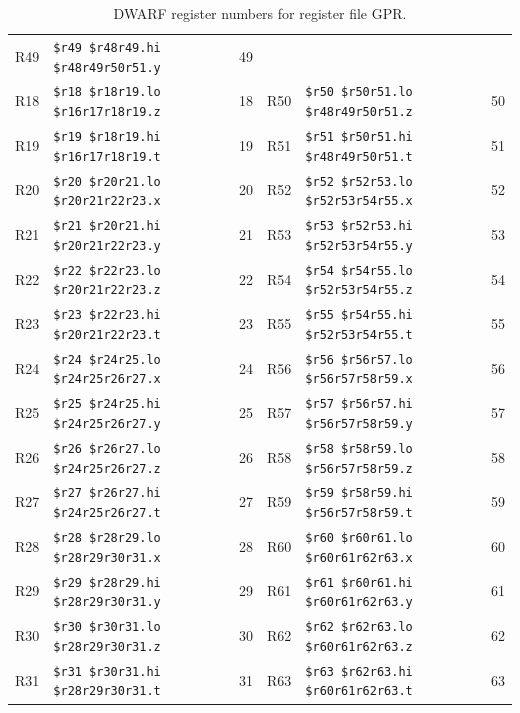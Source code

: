 \begin{table}
\begin{center}
{\begin{tabular}{|l|l|l||l|l|l|}
R49 & \verb|$r49 $r48r49.hi $r48r49r50r51.y| & 49 \\
R18 & \verb|$r18 $r18r19.lo $r16r17r18r19.z| & 18 &
R50 & \verb|$r50 $r50r51.lo $r48r49r50r51.z| & 50 \\
R19 & \verb|$r19 $r18r19.hi $r16r17r18r19.t| & 19 &
R51 & \verb|$r51 $r50r51.hi $r48r49r50r51.t| & 51 \\
R20 & \verb|$r20 $r20r21.lo $r20r21r22r23.x| & 20 &
R52 & \verb|$r52 $r52r53.lo $r52r53r54r55.x| & 52 \\
R21 & \verb|$r21 $r20r21.hi $r20r21r22r23.y| & 21 &
R53 & \verb|$r53 $r52r53.hi $r52r53r54r55.y| & 53 \\
R22 & \verb|$r22 $r22r23.lo $r20r21r22r23.z| & 22 &
R54 & \verb|$r54 $r54r55.lo $r52r53r54r55.z| & 54 \\
R23 & \verb|$r23 $r22r23.hi $r20r21r22r23.t| & 23 &
R55 & \verb|$r55 $r54r55.hi $r52r53r54r55.t| & 55 \\
R24 & \verb|$r24 $r24r25.lo $r24r25r26r27.x| & 24 &
R56 & \verb|$r56 $r56r57.lo $r56r57r58r59.x| & 56 \\
R25 & \verb|$r25 $r24r25.hi $r24r25r26r27.y| & 25 &
R57 & \verb|$r57 $r56r57.hi $r56r57r58r59.y| & 57 \\
R26 & \verb|$r26 $r26r27.lo $r24r25r26r27.z| & 26 &
R58 & \verb|$r58 $r58r59.lo $r56r57r58r59.z| & 58 \\
R27 & \verb|$r27 $r26r27.hi $r24r25r26r27.t| & 27 &
R59 & \verb|$r59 $r58r59.hi $r56r57r58r59.t| & 59 \\
R28 & \verb|$r28 $r28r29.lo $r28r29r30r31.x| & 28 &
R60 & \verb|$r60 $r60r61.lo $r60r61r62r63.x| & 60 \\
R29 & \verb|$r29 $r28r29.hi $r28r29r30r31.y| & 29 &
R61 & \verb|$r61 $r60r61.hi $r60r61r62r63.y| & 61 \\
R30 & \verb|$r30 $r30r31.lo $r28r29r30r31.z| & 30 &
R62 & \verb|$r62 $r62r63.lo $r60r61r62r63.z| & 62 \\
R31 & \verb|$r31 $r30r31.hi $r28r29r30r31.t| & 31 &
R63 & \verb|$r63 $r62r63.hi $r60r61r62r63.t| & 63 \\
\hline \end{tabular}
}
\end{center}
\caption{DWARF register numbers for register file GPR.}
\label{table:DwarfId-GPR}
\end{table}

